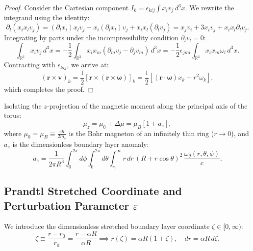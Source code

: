 \documentclass[12pt,a4paper]{article}
\begin{document}
	\begin{proof}
		Consider the Cartesian component $I_k = \epsilon_{kij} \int x_i v_j \, d^3x$. We rewrite the integrand using the identity:
		\begin{equation}
			\partial_l (x_i x_l v_j) = (\partial_l x_i) x_l v_j + x_i (\partial_l x_l) v_j + x_i x_l (\partial_l v_j) = x_j v_i + 3 x_i v_j + x_i x_l \partial_l v_j.
		\end{equation}
		Integrating by parts under the incompressibility condition $\partial_l v_l = 0$:
		\begin{equation}
			\int_{\mathbb{R}^3} x_i v_j \, d^3x = -\frac{1}{2} \int_{\mathbb{R}^3} x_i x_m (\partial_m v_j - \partial_j v_m) \, d^3x = -\frac{1}{2} \epsilon_{jml} \int_{\mathbb{R}^3} x_i x_m \omega_l \, d^3x.
		\end{equation}
		Contracting with $\epsilon_{kij}$, we arrive at:
		\begin{equation}
			(\mathbf{r} \times \mathbf{v})_k = \frac{1}{2} \left[ \mathbf{r} \times (\mathbf{r} \times \boldsymbol{\omega}) \right]_k = \frac{1}{2} \left[ (\mathbf{r} \cdot \boldsymbol{\omega}) x_k - r^2 \omega_k \right],
		\end{equation}
		which completes the proof.
	\end{proof}
	
	Isolating the $z$-projection of the magnetic moment along the principal axis of the torus:
	\begin{equation}
		\mu_z = \mu_0 + \Delta \mu = \mu_B \left[ 1 + a_e \right],
	\end{equation}
	where $\mu_0 = \mu_B \equiv \frac{e\hbar}{2m_e}$ is the Bohr magneton of an infinitely thin ring ($r \to 0$), and $a_e$ is the dimensionless boundary layer anomaly:
	\begin{equation}
		a_e = \frac{1}{2\pi R^3} \int_0^{2\pi} d\phi \int_0^{2\pi} d\theta \int_{r_0}^\infty r \, dr \, (R + r \cos\theta)^2 \, \frac{\omega_\theta(r, \theta, \phi)}{c}.
		\label{eq:master_anomaly_integral}
	\end{equation}
	
	\subsection{Prandtl Stretched Coordinate and Perturbation Parameter $\varepsilon$}
	We introduce the dimensionless stretched boundary layer coordinate $\zeta \in [0, \infty)$:
	\begin{equation}
		\zeta \equiv \frac{r - r_0}{r_0} = \frac{r - \alpha R}{\alpha R} \implies r(\zeta) = \alpha R (1 + \zeta), \quad dr = \alpha R \, d\zeta.
	\end{equation}
	
\end{document}
